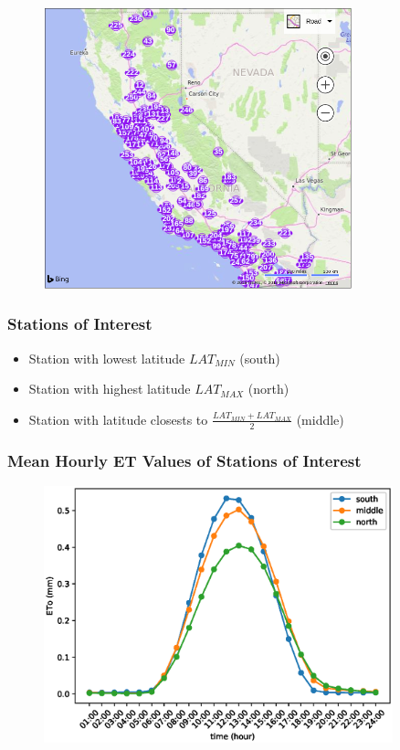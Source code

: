 \begin{frame}
\begin{figure}
\includegraphics[width=0.8\textwidth]{images/cimis-station-location}
\end{figure}
\end{frame}

\begin{frame}
\frametitle{Stations of Interest}
\begin{itemize}
	\setlength\itemsep{1em}
	\item Station with lowest latitude $LAT_{MIN}$ (south)
	\item Station with highest latitude $LAT_{MAX}$ (north)
	\item Station with latitude closests to $\frac{LAT_{MIN}+LAT_{MAX}}{2}$ (middle)
\end{itemize}
\end{frame}

\begin{frame}
\frametitle{Mean Hourly ET Values of Stations of Interest}
\begin{figure}
\includegraphics[width=0.9\textwidth]{images/soi-latitude-mean-of-hourly-eto-values}
\end{figure}
\end{frame}

